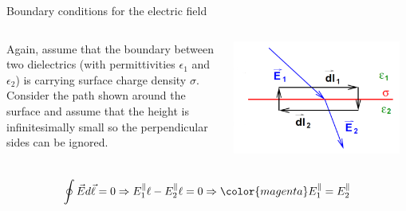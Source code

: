 %
%
%

\begin{frame}{Boundary conditions for the electric field}

\begin{columns}
  \begin{column}{0.50\textwidth}
   {\small
     Again, assume that the boundary between two dielectrics (with
     permittivities $\epsilon_1$ and  $\epsilon_2$)
     is carrying surface charge density $\sigma$.\\
     Consider the path shown around the surface and
     assume that the height is infinitesimally small so the perpendicular
     sides can be ignored.
  }
  \end{column}
  \begin{column}{0.50\textwidth}
    \begin{center}
      \includegraphics[width=0.95\textwidth]{./images/schematics/boundary_conditions_electric_field_2.png}\\
    \end{center}
  \end{column}
\end{columns}

\begin{equation*}
  \oint \vec{E} d\vec{\ell} = 0 \Rightarrow
       E_1^{\parallel} \ell - E_2^{\parallel} \ell = 0 \Rightarrow
         {\color{magenta} E_1^{\parallel} = E_2^{\parallel}}
\end{equation*}

\end{frame}

%
%
%

